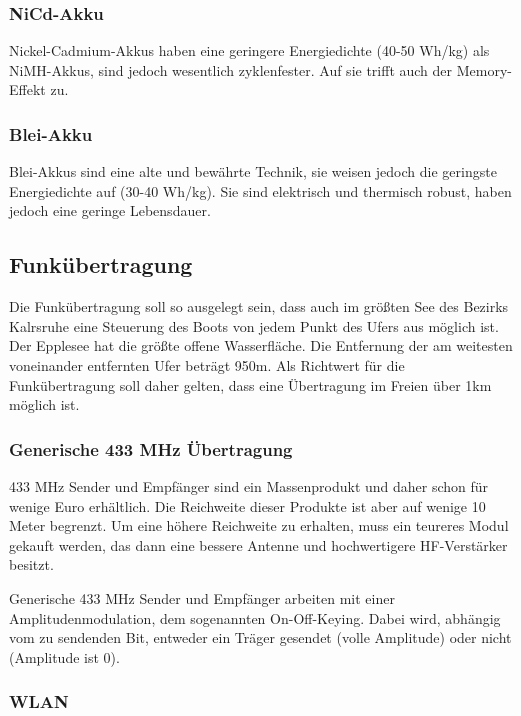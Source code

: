 \documentclass[a4paper]{article}
\begin{document}
\subsubsection{NiCd-Akku}

Nickel-Cadmium-Akkus haben eine geringere Energiedichte (40-50 Wh/kg) als NiMH-Akkus, sind jedoch 
wesentlich zyklenfester. Auf sie trifft auch der Memory-Effekt zu.

\subsubsection{Blei-Akku}

Blei-Akkus sind eine alte und bewährte Technik, sie weisen jedoch die geringste Energiedichte auf 
(30-40 Wh/kg). Sie sind elektrisch und thermisch robust, haben jedoch eine geringe Lebensdauer.

\subsection{Funkübertragung}

Die Funkübertragung soll so ausgelegt sein, dass auch im größten See des Bezirks Kalrsruhe eine Steuerung des Boots von jedem Punkt 
des Ufers aus möglich ist. Der Epplesee hat die größte offene Wasserfläche. Die Entfernung der am weitesten voneinander entfernten 
Ufer beträgt 950m. Als Richtwert für die Funkübertragung soll daher gelten, dass eine Übertragung im Freien über 1km möglich ist.

\subsubsection{Generische 433 MHz Übertragung}

433 MHz Sender und Empfänger sind ein Massenprodukt und daher schon für wenige Euro erhältlich. Die Reichweite dieser Produkte ist 
aber auf wenige 10 Meter begrenzt. Um eine höhere Reichweite zu erhalten, muss ein teureres Modul gekauft werden, das dann eine 
bessere Antenne und hochwertigere HF-Verstärker besitzt.

Generische 433 MHz Sender und Empfänger arbeiten mit einer Amplitudenmodulation, dem sogenannten On-Off-Keying. Dabei wird, abhängig 
vom zu sendenden Bit, entweder ein Träger gesendet (volle Amplitude) oder nicht (Amplitude ist 0).

\subsubsection{WLAN}
\end{document}
